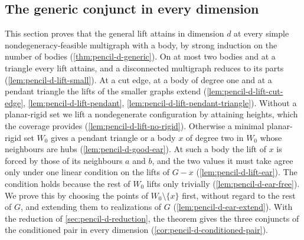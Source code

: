 \subsection{The generic conjunct in every dimension}
\label{sec:pencil-d-generic}

This section proves that the general lift attains in dimension $d$ at
every simple nondegeneracy-feasible multigraph with a body, by strong
induction on the number of bodies (\cref{thm:pencil-d-generic}). On at
most two bodies and at a triangle
every lift attains, and a disconnected multigraph reduces to its parts
(\cref{lem:pencil-d-lift-small}). At a cut edge, at a body of degree one
and at a pendant triangle the lifts of the smaller graphs extend
(\cref{lem:pencil-d-lift-cut-edge}, \cref{lem:pencil-d-lift-pendant},
\cref{lem:pencil-d-lift-pendant-triangle}). Without a planar-rigid set we
lift a nondegenerate configuration by attaining heights, which the
coverage provides (\cref{lem:pencil-d-lift-no-rigid}). Otherwise a
minimal planar-rigid set $W_0$ gives a pendant triangle or a body $x$ of
degree two in $W_0$ whose neighbours are hubs
(\cref{lem:pencil-d-good-ear}). At such a body the lift of $x$ is forced
by those of its neighbours $a$ and $b$, and the two values it must take
agree only under one linear condition on the lifts of $G - x$
(\cref{lem:pencil-d-lift-ear}). The condition holds because the rest of
$W_0$ lifts only trivially (\cref{lem:pencil-d-ear-free}). We prove this
by choosing the points of $W_0 \setminus \{x\}$ first, without regard to
the rest of $G$, and extending them to realizations of $G$
(\cref{lem:pencil-d-ear-extend}). With the reduction of
\cref{sec:pencil-d-reduction}, the theorem gives the three conjuncts of
the conditioned pair in every dimension
(\cref{cor:pencil-d-conditioned-pair}).

